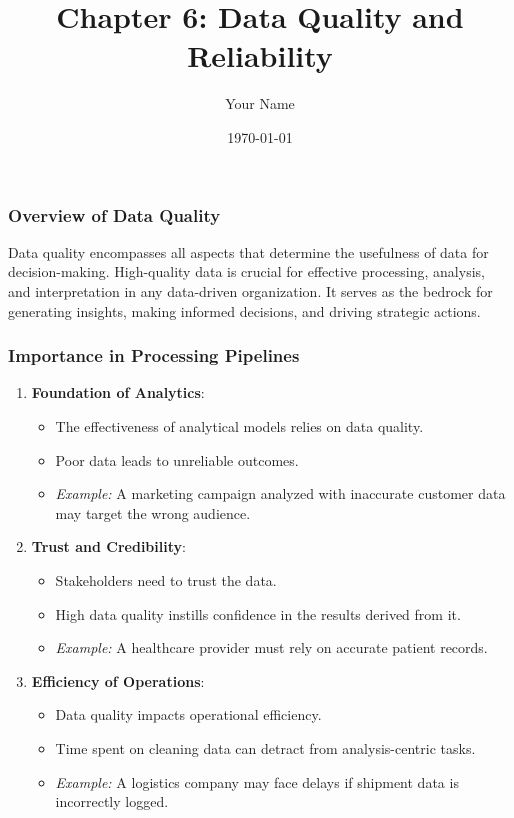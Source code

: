 \documentclass{beamer}
\title{Chapter 6: Data Quality and Reliability}
\author{Your Name}
\institute{Your Institution}
\date{\today}
\begin{document}
\frame{\titlepage}

\begin{frame}[fragile]
    \titlepage
\end{frame}

\begin{frame}[fragile]
    \frametitle{Overview of Data Quality}
    
    Data quality encompasses all aspects that determine the usefulness of data for decision-making. 
    High-quality data is crucial for effective processing, analysis, and interpretation in any data-driven organization. 
    It serves as the bedrock for generating insights, making informed decisions, and driving strategic actions.
\end{frame}

\begin{frame}[fragile]
    \frametitle{Importance in Processing Pipelines}
    
    \begin{enumerate}
        \item \textbf{Foundation of Analytics}:
            \begin{itemize}
                \item The effectiveness of analytical models relies on data quality. 
                \item Poor data leads to unreliable outcomes.
                \item \textit{Example:} A marketing campaign analyzed with inaccurate customer data may target the wrong audience.
            \end{itemize}
        
        \item \textbf{Trust and Credibility}:
            \begin{itemize}
                \item Stakeholders need to trust the data.
                \item High data quality instills confidence in the results derived from it.
                \item \textit{Example:} A healthcare provider must rely on accurate patient records.
            \end{itemize}
        
        \item \textbf{Efficiency of Operations}:
            \begin{itemize}
                \item Data quality impacts operational efficiency.
                \item Time spent on cleaning data can detract from analysis-centric tasks.
                \item \textit{Example:} A logistics company may face delays if shipment data is incorrectly logged.
            \end{itemize}
    \end{enumerate}
\end{frame}
\end{document}
